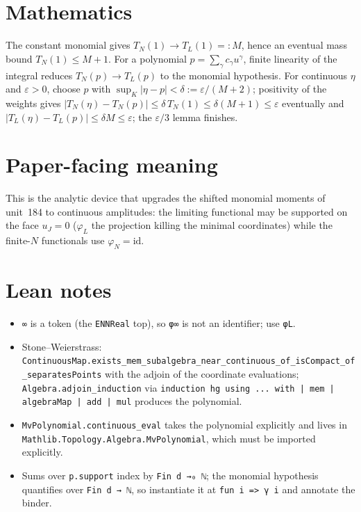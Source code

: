 \documentclass[11pt]{article}
\begin{document}
\section{Mathematics}
The constant monomial gives $T_N(1)\to T_L(1)=:M$, hence an eventual mass bound $T_N(1)\le M+1$.
For a polynomial $p=\sum_\gamma c_\gamma u^\gamma$, finite linearity of the integral reduces
$T_N(p)\to T_L(p)$ to the monomial hypothesis. For continuous $\eta$ and $\varepsilon>0$, choose $p$
with $\sup_K|\eta-p|<\delta:=\varepsilon/(M+2)$; positivity of the weights gives
$|T_N(\eta)-T_N(p)|\le\delta\,T_N(1)\le\delta(M+1)\le\varepsilon$ eventually and
$|T_L(\eta)-T_L(p)|\le\delta M\le\varepsilon$; the $\varepsilon/3$ lemma finishes.

\section{Paper-facing meaning}
This is the analytic device that upgrades the shifted monomial moments of unit~184 to continuous
amplitudes: the limiting functional may be supported on the face $u_J=0$ ($\varphi_L$ the projection
killing the minimal coordinates) while the finite-$N$ functionals use $\varphi_N=\mathrm{id}$.

\section{Lean notes}
\begin{itemize}
\item \texttt{∞} is a token (the \texttt{ENNReal} top), so \texttt{φ∞} is not an identifier; use
\texttt{φL}.
\item Stone--Weierstrass: \texttt{ContinuousMap.exists\_mem\_subalgebra\_near\_}\allowbreak\texttt{continuous\_of\_isCompact\_of\_separatesPoints}
with the adjoin of the coordinate evaluations; \texttt{Algebra.adjoin\_induction} via
\texttt{induction hg using ... with | mem | algebraMap | add | mul} produces the polynomial.
\item \texttt{MvPolynomial.continuous\_eval} takes the polynomial explicitly and lives in
\texttt{Mathlib.Topology.Algebra.MvPolynomial}, which must be imported explicitly.
\item Sums over \texttt{p.support} index by \texttt{Fin d →₀ ℕ}; the monomial hypothesis quantifies over
\texttt{Fin d → ℕ}, so instantiate it at \texttt{fun i => γ i} and annotate the binder.
\end{itemize}
\end{document}
